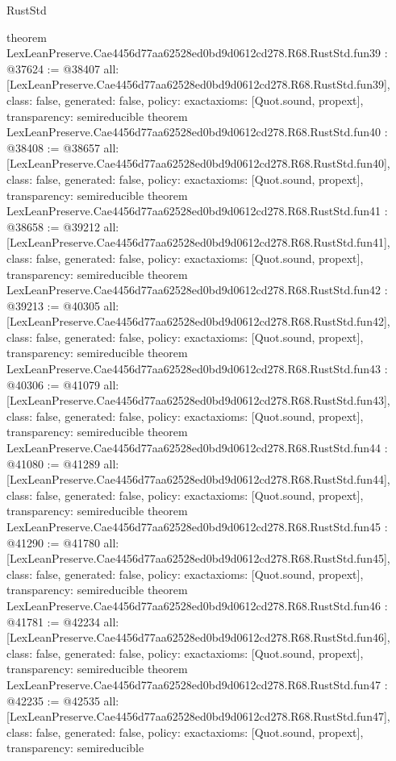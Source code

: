 \begin{lexlean}{RustStd}
\begin{coremodule}
{}
theorem LexLeanPreserve.Cae4456d77aa62528ed0bd9d0612cd278.R68.RustStd.fun39 : @37624 := @38407 {
  all: [LexLeanPreserve.Cae4456d77aa62528ed0bd9d0612cd278.R68.RustStd.fun39],
  class: false,
  generated: false,
  policy: exact{axioms: [Quot.sound, propext]},
  transparency: semireducible
}
theorem LexLeanPreserve.Cae4456d77aa62528ed0bd9d0612cd278.R68.RustStd.fun40 : @38408 := @38657 {
  all: [LexLeanPreserve.Cae4456d77aa62528ed0bd9d0612cd278.R68.RustStd.fun40],
  class: false,
  generated: false,
  policy: exact{axioms: [Quot.sound, propext]},
  transparency: semireducible
}
theorem LexLeanPreserve.Cae4456d77aa62528ed0bd9d0612cd278.R68.RustStd.fun41 : @38658 := @39212 {
  all: [LexLeanPreserve.Cae4456d77aa62528ed0bd9d0612cd278.R68.RustStd.fun41],
  class: false,
  generated: false,
  policy: exact{axioms: [Quot.sound, propext]},
  transparency: semireducible
}
theorem LexLeanPreserve.Cae4456d77aa62528ed0bd9d0612cd278.R68.RustStd.fun42 : @39213 := @40305 {
  all: [LexLeanPreserve.Cae4456d77aa62528ed0bd9d0612cd278.R68.RustStd.fun42],
  class: false,
  generated: false,
  policy: exact{axioms: [Quot.sound, propext]},
  transparency: semireducible
}
theorem LexLeanPreserve.Cae4456d77aa62528ed0bd9d0612cd278.R68.RustStd.fun43 : @40306 := @41079 {
  all: [LexLeanPreserve.Cae4456d77aa62528ed0bd9d0612cd278.R68.RustStd.fun43],
  class: false,
  generated: false,
  policy: exact{axioms: [Quot.sound, propext]},
  transparency: semireducible
}
theorem LexLeanPreserve.Cae4456d77aa62528ed0bd9d0612cd278.R68.RustStd.fun44 : @41080 := @41289 {
  all: [LexLeanPreserve.Cae4456d77aa62528ed0bd9d0612cd278.R68.RustStd.fun44],
  class: false,
  generated: false,
  policy: exact{axioms: [Quot.sound, propext]},
  transparency: semireducible
}
theorem LexLeanPreserve.Cae4456d77aa62528ed0bd9d0612cd278.R68.RustStd.fun45 : @41290 := @41780 {
  all: [LexLeanPreserve.Cae4456d77aa62528ed0bd9d0612cd278.R68.RustStd.fun45],
  class: false,
  generated: false,
  policy: exact{axioms: [Quot.sound, propext]},
  transparency: semireducible
}
theorem LexLeanPreserve.Cae4456d77aa62528ed0bd9d0612cd278.R68.RustStd.fun46 : @41781 := @42234 {
  all: [LexLeanPreserve.Cae4456d77aa62528ed0bd9d0612cd278.R68.RustStd.fun46],
  class: false,
  generated: false,
  policy: exact{axioms: [Quot.sound, propext]},
  transparency: semireducible
}
theorem LexLeanPreserve.Cae4456d77aa62528ed0bd9d0612cd278.R68.RustStd.fun47 : @42235 := @42535 {
  all: [LexLeanPreserve.Cae4456d77aa62528ed0bd9d0612cd278.R68.RustStd.fun47],
  class: false,
  generated: false,
  policy: exact{axioms: [Quot.sound, propext]},
  transparency: semireducible
}
\end{coremodule}
\end{lexlean}
